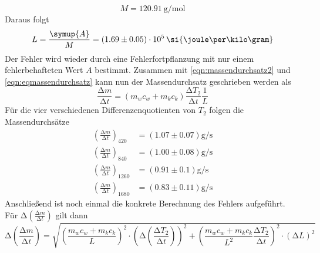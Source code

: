 \begin{equation}
M = \SI{120.91}{\gram\per\mol}
\end{equation}
Daraus folgt
\begin{equation}
L = \frac{\symup{A}}{M} = (1.69 \pm 0.05) \cdot 10^{5} \, \si{\joule\per\kilo\gram}
\end{equation}
Der Fehler wird wieder durch eine Fehlerfortpflanzung mit nur einem fehlerbehafteten Wert $A$ bestimmt.
Zusammen mit \eqref{eqn:massendurchsatz2} und \eqref{eqn:eqmassendurchsatz} kann nun der Massendurchsatz geschrieben werden als
\begin{equation}
\frac{\increment m}{\increment t} = (m_{w}c_{w} + m_{k}c_{k})\frac{\increment T_{2}}{\increment t} \frac{1}{L}
\end{equation}
Für die vier verschiedenen Differenzenquotienten von $T_{2}$ folgen die Massendurchsätze
\begin{align}
\left( \frac{\increment m}{\increment t} \right)_{420} &= (1.07 \pm 0.07) \si{\gram\per\second} \\
\left( \frac{\increment m}{\increment t} \right)_{840} &= (1.00 \pm 0.08) \si{\gram\per\second} \\
\left( \frac{\increment m}{\increment t} \right)_{1260}&= (0.91 \pm 0.1) \si{\gram\per\second} \\
\left( \frac{\increment m}{\increment t} \right)_{1680}&= (0.83 \pm 0.11) \si{\gram\per\second} 
\end{align}
Anschließend ist noch einmal die konkrete Berechnung des Fehlers aufgeführt.
Für $\increment \left( \frac{\increment m}{\increment t} \right) $ gilt dann
\begin{equation}
\increment \left(\frac{\increment m}{\increment t}\right) = \sqrt{\left( \frac{m_{w}c_{w} + m_{k}c_{k}}{L} \right)^{2} \cdot \left( \increment \left( \frac{\increment T_{2}}{\increment t}\right) \right)^2 +
\left( \frac{m_{w}c_{w} + m_{k}c_{k}}{L^{2}} \frac{\increment T_{2}}{\increment t}\right)^{2} \cdot (\increment L)^2}
\end{equation}

